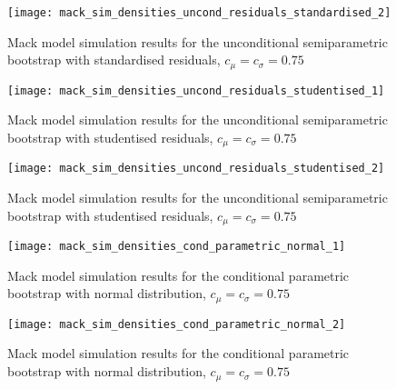 \documentclass[a4paper]{book}
\begin{document}
\begin{landscape}
  \begin{figure}
    \ContinuedFloat
    \captionsetup{list=off,format=cont}
    \centering
    \texttt{[image: mack\_sim\_densities\_uncond\_residuals\_standardised\_2]}
    \caption{Mack model simulation results for the unconditional semiparametric bootstrap with standardised residuals, $c_\mu = c_\sigma = 0.75$}
  \end{figure}
\end{landscape}

\begin{landscape}
  \begin{figure}
    \centering
    \texttt{[image: mack\_sim\_densities\_uncond\_residuals\_studentised\_1]}
    \caption{Mack model simulation results for the unconditional semiparametric bootstrap with studentised residuals, $c_\mu = c_\sigma = 0.75$}
    \label{fig:mack-sim-uncond-semiparam-student}
  \end{figure}
\end{landscape}

\begin{landscape}
  \begin{figure}
    \ContinuedFloat
    \captionsetup{list=off,format=cont}
    \centering
    \texttt{[image: mack\_sim\_densities\_uncond\_residuals\_studentised\_2]}
    \caption{Mack model simulation results for the unconditional semiparametric bootstrap with studentised residuals, $c_\mu = c_\sigma = 0.75$}
  \end{figure}
\end{landscape}

\begin{landscape}
  \begin{figure}
    \centering
    \texttt{[image: mack\_sim\_densities\_cond\_parametric\_normal\_1]}
    \caption{Mack model simulation results for the conditional parametric bootstrap with normal distribution, $c_\mu = c_\sigma = 0.75$}
    \label{fig:mack-sim-cond-param}
  \end{figure}
\end{landscape}

\begin{landscape}
  \begin{figure}
    \ContinuedFloat
    \captionsetup{list=off,format=cont}
    \centering
    \texttt{[image: mack\_sim\_densities\_cond\_parametric\_normal\_2]}
    \caption{Mack model simulation results for the conditional parametric bootstrap with normal distribution, $c_\mu = c_\sigma = 0.75$}
  \end{figure}
\end{landscape}
\end{document}
